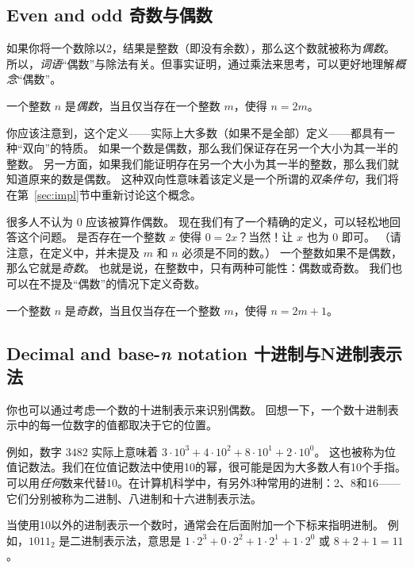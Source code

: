 \subsection{Even and odd 奇数与偶数}
\label{even_n_odd}


如果你将一个数除以2，结果是整数（即没有余数），那么这个数就被称为{\em 偶数}。
所以，{\em 词语}“偶数”与除法有关。但事实证明，通过乘法来思考，可以更好地理解{\em 概念}“偶数”。


\begin{defi}
  一个整数 $n$ 是{\em 偶数}，当且仅当存在一个整数 $m$，使得 $n = 2m$。
\end{defi}

你应该注意到，这个定义——实际上大多数（如果不是全部）定义——都具有一种“双向”的特质。
如果一个数是偶数，那么我们保证存在另一个大小为其一半的整数。
另一方面，如果我们能证明存在另一个大小为其一半的整数，那么我们就知道原来的数是偶数。
这种双向性意味着该定义是一个所谓的{\em 双条件句}，我们将在第~\ref{sec:impl}节中重新讨论这个概念。

很多人不认为 $0$ 应该被算作偶数。
现在我们有了一个精确的定义，可以轻松地回答这个问题。
是否存在一个整数 $x$ 使得 $0 = 2x$？当然！让 $x$ 也为 $0$ 即可。
（请注意，在定义中，并未提及 $m$ 和 $n$ 必须是不同的数。）
一个整数如果不是偶数，那么它就是{\em 奇数}。
也就是说，在整数中，只有两种可能性：偶数或奇数。
我们也可以在不提及“偶数”的情况下定义奇数。

\begin{defi}
  一个整数 $n$ 是{\em 奇数}，当且仅当存在一个整数 $m$，使得 $n = 2m + 1$。
\end{defi}


\subsection{Decimal and base-\emph{n} notation 十进制与N进制表示法}\label{base-n}

你也可以通过考虑一个数的十进制表示来识别偶数。
回想一下，一个数十进制表示中的每一位数字的值都取决于它的位置。

例如，数字 $3482$ 实际上意味着 $3\cdot10^3 + 4\cdot10^2 + 8\cdot10^1 + 2\cdot10^0$。
这也被称为位值记数法。我们在位值记数法中使用10的幂，很可能是因为大多数人有10个手指。
可以用{\em 任何}数来代替10。在计算机科学中，有另外3种常用的进制：2、8和16——它们分别被称为二进制、八进制和十六进制表示法。

当使用10以外的进制表示一个数时，通常会在后面附加一个下标来指明进制。
例如，$1011_2$ 是二进制表示法，意思是 $1\cdot2^3 + 0\cdot2^2 + 1\cdot2^1 + 1\cdot2^0$ 或 $8+2+1 = 11$。

